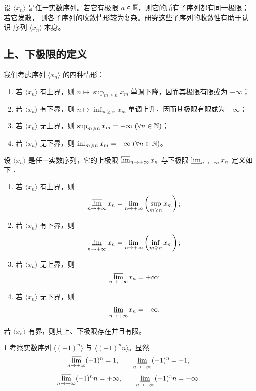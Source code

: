 设 \(\langle x_n\rangle\) 是任一实数序列。若它有极限
\(a\in\overline{\mathbb{R}}\)，则它的所有子序列都有同一极限；若它发散，
则各子序列的收敛情形较为复杂。研究这些子序列的收敛性有助于认识
序列 \(\langle x_n\rangle\) 本身。

\subsection{上、下极限的定义}
	\label{sec:3-5-1}

我们考虑序列 \(\langle x_n\rangle\) 的四种情形：
\begin{enumerate}[label=\arabic*)]
  \item 若 \(\langle x_n\rangle\) 有上界，则
  \(n\mapsto\sup_{m\geqslant n}x_m\) 单调下降，因而其极限有限或为
  \(-\infty\)；
  \item 若 \(\langle x_n\rangle\) 有下界，则
  \(n\mapsto\inf_{m\geqslant n}x_m\) 单调上升，因而其极限有限或为
  \(+\infty\)；
  \item 若 \(\langle x_n\rangle\) 无上界，则
  \(\sup_{m\geqslant n}x_m=+\infty\ (\forall n\in\N)\)；
  \item 若 \(\langle x_n\rangle\) 无下界，则
  \(\inf_{m\geqslant n}x_m=-\infty\ (\forall n\in\N)\)。
\end{enumerate}

\begin{mydef*}{}
设 \(\langle x_n\rangle\) 是任一实数序列，它的上极限
\(\varlimsup_{n\to+\infty}x_n\) 与下极限
\(\varliminf_{n\to+\infty}x_n\) 定义如下：
\begin{enumerate}[label=\arabic*)]
  \item 若 \(\langle x_n\rangle\) 有上界，则
  \[
  \varlimsup_{n\to+\infty}x_n
  =\lim_{n\to+\infty}\left(\sup_{m\geqslant n}x_m\right);
  \]
  \item 若 \(\langle x_n\rangle\) 有下界，则
  \[
  \varliminf_{n\to+\infty}x_n
  =\lim_{n\to+\infty}\left(\inf_{m\geqslant n}x_m\right);
  \]
  \item 若 \(\langle x_n\rangle\) 无上界，则
  \[
  \varlimsup_{n\to+\infty}x_n=+\infty;
  \]
  \item 若 \(\langle x_n\rangle\) 无下界，则
  \[
  \varliminf_{n\to+\infty}x_n=-\infty.
  \]
\end{enumerate}
\end{mydef*}

若 \(\langle x_n\rangle\) 有界，则其上、下极限存在并且有限。

\begin{sourceexample}{1}
考察实数序列 \(\langle(-1)^n\rangle\) 与
\(\langle(-1)^n n\rangle\)。显然
\[
\varlimsup_{n\to+\infty}(-1)^n=1,\qquad
\varliminf_{n\to+\infty}(-1)^n=-1,
\]
\[
\varlimsup_{n\to+\infty}(-1)^n n=+\infty,\qquad
\varliminf_{n\to+\infty}(-1)^n n=-\infty.
\]
\end{sourceexample}


